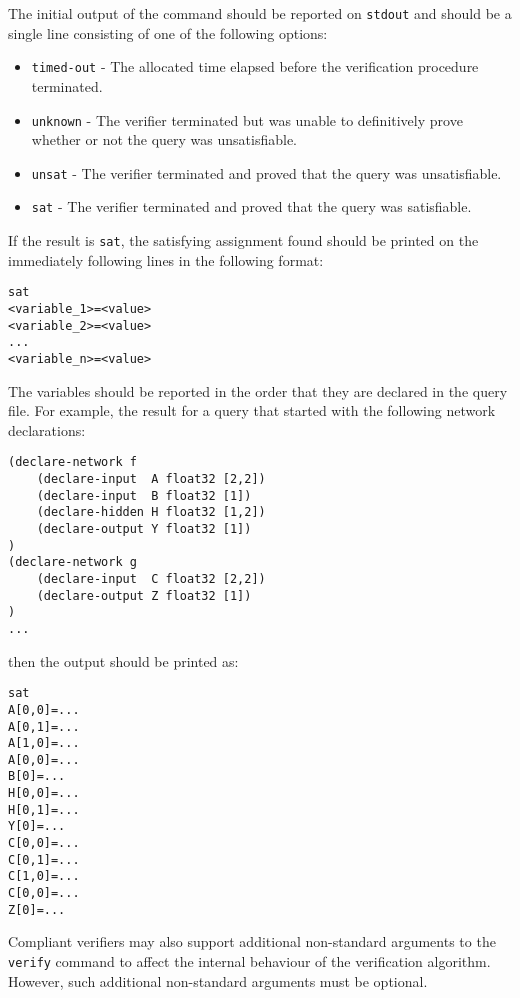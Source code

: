 

\noindent The initial output of the command should be reported on \texttt{stdout} and should be a single line consisting of one of the following options: 
\begin{itemize}
\item \texttt{timed-out} - The allocated time elapsed before the verification procedure terminated.
\item \texttt{unknown} - The verifier terminated but was unable to definitively prove whether or not the query was unsatisfiable.
\item \texttt{unsat} - The verifier terminated and proved that the query was unsatisfiable.
\item \texttt{sat} - The verifier terminated and proved that the query was satisfiable.
\end{itemize}
If the result is \texttt{sat}, the satisfying assignment found should be printed on the immediately following lines in the following format:
\begin{lstlisting}[style=bash]
sat
<variable_1>=<value>
<variable_2>=<value>
...
<variable_n>=<value>
\end{lstlisting}
The variables should be reported in the order that they are declared in the query file. For example, the result for a \vnnlib{} query that started with the following network declarations:
\begin{lstlisting}[style=bash]
(declare-network f
    (declare-input  A float32 [2,2])
    (declare-input  B float32 [1])
    (declare-hidden H float32 [1,2])
    (declare-output Y float32 [1])
)
(declare-network g
    (declare-input  C float32 [2,2])
    (declare-output Z float32 [1])
)
...
\end{lstlisting}
then the output should be printed as:
\begin{lstlisting}[style=bash]
sat
A[0,0]=...
A[0,1]=...
A[1,0]=...
A[0,0]=...
B[0]=...
H[0,0]=...
H[0,1]=...
Y[0]=...
C[0,0]=...
C[0,1]=...
C[1,0]=...
C[0,0]=...
Z[0]=...
\end{lstlisting}
Compliant verifiers may also support additional non-standard arguments to the \texttt{verify} command to affect the internal behaviour of the verification algorithm. However, such additional non-standard arguments must be optional.

